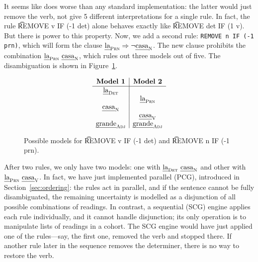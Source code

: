 It seems like \satcg{} does worse than any standard \onlycg{} implementation:
the latter would just remove the verb, not give 5 different interpretations for a single rule.
In fact, the rule \t{REMOVE v IF (-1 det)} alone behaves exactly like \t{REMOVE det IF (1 v)}.
But there is power to this property. Now, we add a second rule: \texttt{REMOVE n IF (-1 prn)}, which will form the clause $\text{\em la}_{\text{\sc Prn}} \Rightarrow \neg \text{\em casa}_{\text{\sc N}}$. The new clause
prohibits the combination $\text{\em la}_{\text{\sc Prn}} \ \text{\em casa}_{\text{\sc N}}$, which rules out three models out of five. The disambiguation is shown in Figure~\ref{fig:modelsTwoRules}.

\begin{figure}[h!]
\centering
$$\begin{array}{ c | c }
 \textbf{Model 1}  & \textbf{Model 2}  \\ \hline
 \laDet   &          \\
          &  \laPrn  \\
 \casaN   &          \\
          &  \casaV   \\
\grandeAdj & \grandeAdj \\

\end{array}$$
\caption{Possible models for \t{REMOVE v IF (-1 det)} and \t{REMOVE n IF (-1 prn)}.}
\label{fig:modelsTwoRules}
\end{figure}


After two rules, we only have two models: one with $\text{\em la}_{\text{\sc Det}} \ \text{\em casa}_{\text{\sc N}}$ and other with $\text{\em la}_{\text{\sc Prn}} \ \text{\em casa}_{\text{\sc V}}$.
In fact, we have just implemented parallel \onlycg{} (PCG), introduced in Section~\ref{sec:ordering}: the rules act in parallel, and if the sentence cannot be fully disambiguated, the remaining uncertainty is modelled as a disjunction of all possible combinations of readings.
In contrast, a sequential \onlycg{} (SCG) engine applies each rule individually, and it cannot handle disjunction; its only operation is to manipulate lists of readings in a cohort.
The SCG engine would have just applied one of the rules---say, the first one, removed the verb and stopped there. If another rule later in the sequence removes the determiner, there is no way to restore the verb.

